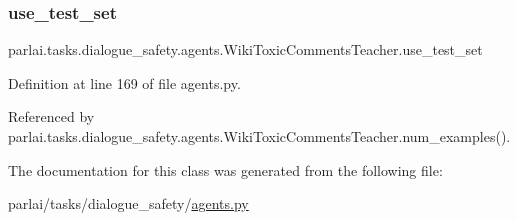 \subsubsection{\texorpdfstring{use\+\_\+test\+\_\+set}{use\_test\_set}}
{\footnotesize\ttfamily parlai.\+tasks.\+dialogue\+\_\+safety.\+agents.\+Wiki\+Toxic\+Comments\+Teacher.\+use\+\_\+test\+\_\+set}



Definition at line 169 of file agents.\+py.



Referenced by parlai.\+tasks.\+dialogue\+\_\+safety.\+agents.\+Wiki\+Toxic\+Comments\+Teacher.\+num\+\_\+examples().



The documentation for this class was generated from the following file\+:\begin{DoxyCompactItemize}
\item 
parlai/tasks/dialogue\+\_\+safety/\hyperlink{parlai_2tasks_2dialogue__safety_2agents_8py}{agents.\+py}\end{DoxyCompactItemize}
